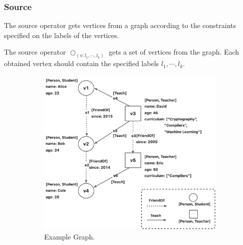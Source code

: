\iffalse
\subsubsection{Source}
The source operator gets vertices from a graph according to the constraints specified on the labels of the vertices.

\begin{definition}
    The source operator $\bigcirc_{(v:l_1, \cdots, l_k)}$ gets a set of vertices from the graph.
    Each obtained vertex should contain the specified labels $l_1, \cdots, l_k$.
\end{definition}

\begin{figure}
    \centering
    \begin{subfigure}[b]{0.4\linewidth}
        \centering
        \includegraphics[width=\linewidth]{./figures/example-graph.png}
        \caption{Example Graph.}
        \label{fig:example-graph}
    \end{subfigure}
    \begin{subfigure}[b]{0.4\linewidth}
        \centering

\end{subfigure}
\end{figure}
